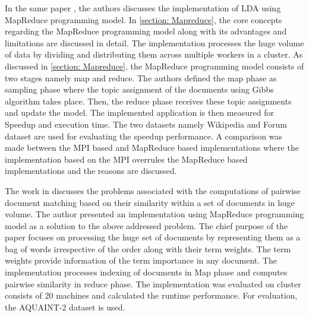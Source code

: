 In the same paper \cite{wang2009plda}, the authors discusses the implementation of LDA using MapReduce programming model. In \ref{section: Mapreduce}, the core concepts regarding the MapReduce programming model along with its advantages and limitations are discussed in detail. The implementation processes the huge volume of data by dividing and distributing them across multiple workers in a cluster. As discussed in \ref{section: Mapreduce}, the MapReduce programming model consists of two stages namely map and reduce. The authors defined the map phase as sampling phase where the topic assignment of the documents using Gibbs algorithm takes place. Then, the reduce phase receives these topic assignments and update the model. The implemented application is then measured for Speedup and execution time. The two datasets namely Wikipedia and Forum dataset are used for evaluating the speedup performance. A comparison was made between the MPI based and MapReduce based implementations where the implementation based on the MPI overrules the MapReduce based implementations and the reasons are discussed.


\par The work in  \cite{elsayed2008pairwise} discusses the problems associated with the computations of pairwise document matching based on their similarity within a set of documents in huge volume. The author presented an implementation using MapReduce programming model as a solution to the above addressed problem. The chief purpose of the paper focuses on processing the huge set of documents by representing them as a bag of words irrespective of the order along with their term weights. The term weights provide information of the term importance in any document. The implementation processes indexing of documents in Map phase and computes pairwise similarity in reduce phase. The implementation was evaluated on cluster consists of 20 machines and calculated the runtime performance. For evaluation, the AQUAINT-2 dataset is used. 

